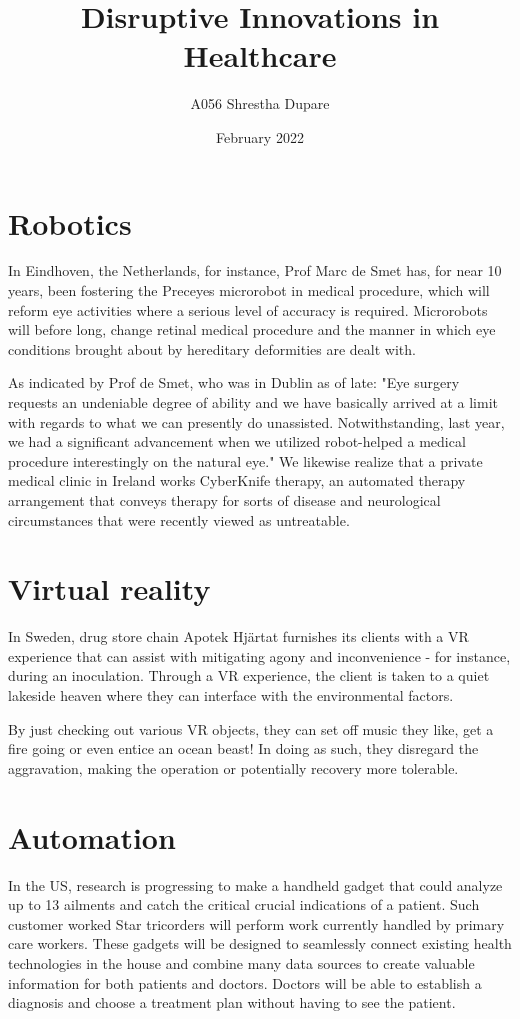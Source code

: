 \documentclass[12pt]{article}
\title{Disruptive Innovations in Healthcare}
\author{A056 Shrestha Dupare}
\date{February 2022}
\begin{document}
\maketitle

\section{Robotics}

In Eindhoven, the Netherlands, for instance, Prof Marc de Smet has, for near 10 years, been fostering the Preceyes microrobot in medical procedure, which will reform eye activities where a serious level of accuracy is required. Microrobots will before long, change retinal medical procedure and the manner in which eye conditions brought about by hereditary deformities are dealt with. 


As indicated by Prof de Smet, who was in Dublin as of late: "Eye surgery requests an undeniable degree of ability and we have basically arrived at a limit with regards to what we can presently do unassisted. Notwithstanding, last year, we had a significant advancement when we utilized robot-helped a medical procedure interestingly on the natural eye." We likewise realize that a private medical clinic in Ireland works CyberKnife therapy, an automated therapy arrangement that conveys therapy for sorts of disease and neurological circumstances that were recently viewed as untreatable.


\section{Virtual reality}

In Sweden, drug store chain Apotek Hjärtat furnishes its clients with a VR experience that can assist with mitigating agony and inconvenience - for instance, during an inoculation. Through a VR experience, the client is taken to a quiet lakeside heaven where they can interface with the environmental factors.

By just checking out various VR objects, they can set off music they like, get a fire going or even entice an ocean beast! In doing as such, they disregard the aggravation, making the operation or potentially recovery more tolerable.


\section{Automation}

In the US, research is progressing to make a handheld gadget that could analyze up to 13 ailments and catch the critical crucial indications of a patient. Such customer worked Star  tricorders will perform work currently handled by primary care workers. These gadgets will be designed to seamlessly connect existing health technologies in the house and combine many data sources to create valuable information for both patients and doctors. Doctors will be able to establish a diagnosis and choose a treatment plan without having to see the patient.
\end{document}
